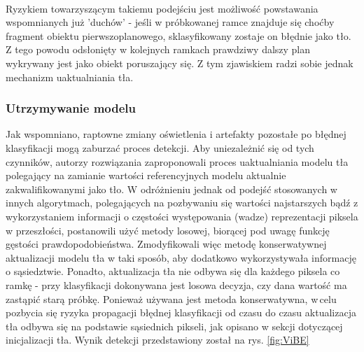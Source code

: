 \paragraph{}
Ryzykiem towarzyszącym takiemu podejściu jest możliwość powstawania wspomnianych już 'duchów' - jeśli w próbkowanej ramce znajduje się choćby fragment obiektu pierwszoplanowego, sklasyfikowany zostaje on błędnie jako tło. Z tego powodu odsłonięty w kolejnych ramkach prawdziwy dalszy plan wykrywany jest jako obiekt poruszający się. Z tym zjawiskiem radzi sobie jednak mechanizm uaktualniania tła.
\subsubsection{Utrzymywanie modelu}
Jak wspomniano, raptowne zmiany oświetlenia i artefakty pozostałe po błędnej klasyfikacji mogą zaburzać proces detekcji. Aby uniezależnić się od tych czynników, autorzy rozwiązania zaproponowali proces uaktualniania modelu tła polegający na zamianie wartości referencyjnych modelu aktualnie zakwalifikowanymi jako tło. W odróżnieniu jednak od podejść stosowanych w innych algorytmach, polegających na pozbywaniu się wartości najstarszych bądź z wykorzystaniem informacji o częstości występowania (wadze) reprezentacji piksela w przeszłości, postanowili użyć metody losowej, biorącej pod uwagę funkcję gęstości prawdopodobieństwa. Zmodyfikowali więc metodę konserwatywnej aktualizacji modelu tła w taki sposób, aby dodatkowo wykorzystywała informację o sąsiedztwie. Ponadto, aktualizacja tła nie odbywa się dla każdego piksela co ramkę - przy klasyfikacji dokonywana jest losowa decyzja, czy dana wartość ma zastąpić starą próbkę. Ponieważ używana jest metoda konserwatywna, w\,celu pozbycia się ryzyka propagacji błędnej klasyfikacji od czasu do czasu aktualizacja tła odbywa się na podstawie sąsiednich pikseli, jak opisano w sekcji dotyczącej inicjalizacji tła. Wynik detekcji przedstawiony został na rys. \ref{fig:ViBE} 
